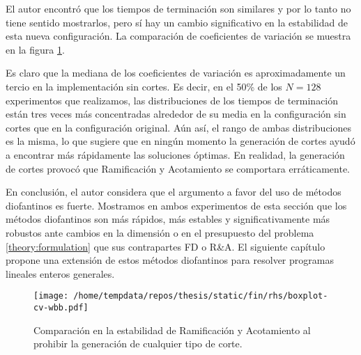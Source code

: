 El autor encontró que los tiempos de terminación son similares y por lo tanto no tiene sentido
mostrarlos, pero sí hay un cambio significativo en la estabilidad de esta nueva configuración. La
comparación de coeficientes de variación se muestra en la figura \ref{fig:exp:fin:rhs:cv-wbb}.

Es claro que la mediana de los coeficientes de variación es aproximadamente un tercio en la
implementación sin cortes. Es decir, en el 50\% de los $N = 128$ experimentos que realizamos, las
distribuciones de los tiempos de terminación están tres veces más concentradas alrededor de su media
en la configuración sin cortes que en la configuración original. Aún así, el rango de ambas
distribuciones es la misma, lo que sugiere que en ningún momento la generación de cortes ayudó a
encontrar más rápidamente las soluciones óptimas. En realidad, la generación de cortes provocó que
Ramificación y Acotamiento se comportara erráticamente.

En conclusión, el autor considera que el argumento a favor del uso de métodos diofantinos es fuerte.
Mostramos en ambos experimentos de esta sección que los métodos diofantinos son más rápidos, más
estables y significativamente más robustos ante cambios en la dimensión o en el presupuesto del
problema \eqref{theory:formulation} que sus contrapartes FD o R\&A. El siguiente capítulo propone
una extensión de estos métodos diofantinos para resolver programas lineales enteros generales.

\begin{figure}[hbtp]
	\centering
	\texttt{[image: /home/tempdata/repos/thesis/static/fin/rhs/boxplot-cv-wbb.pdf]}
	\caption{Comparación en la estabilidad de Ramificación y Acotamiento al prohibir la generación
		de cualquier tipo de corte.}
	\label{fig:exp:fin:rhs:cv-wbb}
\end{figure}
